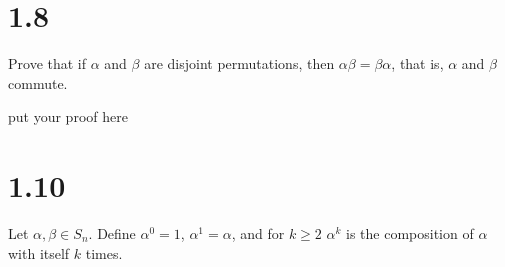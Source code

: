\documentclass[12pt]{article}
\newenvironment{exercises}
{\noindent\begin{tabularx}{\textwidth}{rX}}
{\end{tabularx}}
\newenvironment{exercise}[1]
{\Large#1 &}
{\vspace{1in}\quad \\}
\begin{document}

%
%
%
%
%
%
%
%

%
%
%



\section*{1.8} Prove that if $\alpha$ and $\beta$ are disjoint permutations, then $\alpha\beta=\beta\alpha$, that is, $\alpha$ and $\beta$ commute.

\bigskip

	put your proof here

	\vspace{1in}

\section*{1.10} Let $\alpha, \beta\in S_n$. Define $\alpha^0=1$, $\alpha^1=\alpha$, and for $k\ge 2$ $\alpha^k$ is the composition of $\alpha$ with itself $k$ times.
\end{document}
